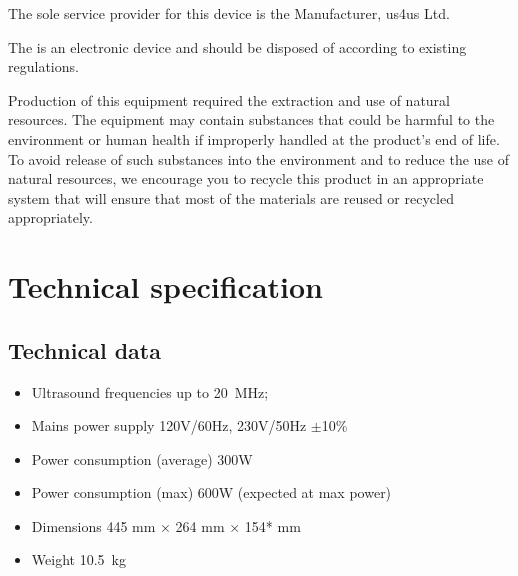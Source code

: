 \documentclass[letterpaper,10pt,english]{sphinxmanual}
\begin{document}
\sphinxAtStartPar
The sole service provider for this device is the Manufacturer, us4us Ltd.

\sphinxAtStartPar
The  is an electronic device and should be disposed of
according to existing regulations.

\sphinxAtStartPar
Production of this equipment required the extraction and use of natural
resources. The equipment may contain substances that could be harmful to
the environment or human health if improperly handled at the product’s
end of life. To avoid release of such substances into the environment
and to reduce the use of natural resources, we encourage you to recycle
this product in an appropriate system that will ensure that most of the
materials are reused or recycled appropriately.

\sphinxstepscope


\chapter{Technical specification}
\label{\detokenize{content/technical_specification:technical-specification}}\label{\detokenize{content/technical_specification::doc}}

\section{Technical data}
\label{\detokenize{content/technical_specification:technical-data}}\begin{itemize}
\item {} 
\sphinxAtStartPar
Ultrasound frequencies up to 20 MHz;

\item {} 
\sphinxAtStartPar
Mains power supply 120V/60Hz, 230V/50Hz \(\pm\)10\%

\item {} 
\sphinxAtStartPar
Power consumption (average) 300W

\item {} 
\sphinxAtStartPar
Power consumption (max) 600W (expected at max power)

\item {} 
\sphinxAtStartPar
Dimensions 445 mm × 264 mm × 154* mm

\end{itemize}
\begin{quote}

\sphinxAtStartPar
{}
\end{quote}
\begin{itemize}
\item {} 
\sphinxAtStartPar
Weight 10.5 kg

\end{itemize}
\end{document}
